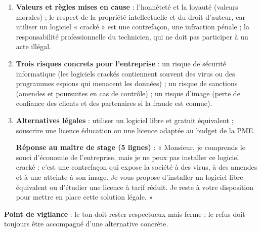 \documentclass[11pt]{article}
\begin{document}
\begin{corrige}
\begin{enumerate}
\item \textbf{Valeurs et règles mises en cause} : l'honnêteté et la loyauté (valeurs morales) ; le respect de la propriété intellectuelle et du droit d'auteur, car utiliser un logiciel « cracké » est une contrefaçon, une infraction pénale ; la responsabilité professionnelle du technicien, qui ne doit pas participer à un acte illégal.
\item \textbf{Trois risques concrets pour l'entreprise} : un risque de sécurité informatique (les logiciels crackés contiennent souvent des virus ou des programmes espions qui menacent les données) ; un risque de sanctions (amendes et poursuites en cas de contrôle) ; un risque d'image (perte de confiance des clients et des partenaires si la fraude est connue).
\item \textbf{Alternatives légales} : utiliser un logiciel libre et gratuit équivalent ; souscrire une licence éducation ou une licence adaptée au budget de la PME.

\textbf{Réponse au maître de stage (5 lignes)} : « Monsieur, je comprends le souci d'économie de l'entreprise, mais je ne peux pas installer ce logiciel cracké : c'est une contrefaçon qui expose la société à des virus, à des amendes et à une atteinte à son image. Je vous propose d'installer un logiciel libre équivalent ou d'étudier une licence à tarif réduit. Je reste à votre disposition pour mettre en place cette solution légale. »
\end{enumerate}
\textbf{Point de vigilance} : le ton doit rester respectueux mais ferme ; le refus doit toujours être accompagné d'une alternative concrète.
\end{corrige}
\end{document}
